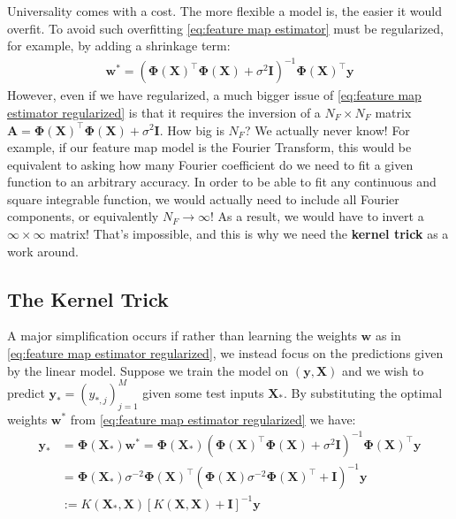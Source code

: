 \documentclass[11pt]{article}
\theoremstyle{plain} %
\theoremstyle{remark}
\begin{document}
Universality comes with a cost. The more flexible a model is, the easier it
would overfit. To avoid such overfitting \cref{eq:feature map estimator} must be regularized, for example,
by adding a shrinkage term:
\begin{align}
  \mathbf{w}^{*}=\left(\mathbf{\Phi}(\mathbf{X})^\top \mathbf{\Phi}(\mathbf{X})+\sigma^{2} \mathbf{I}\right)^{-1} \mathbf{\Phi}(\mathbf{X})^\top \mathbf{y}
  \label{eq:feature map estimator regularized}
\end{align}
However, even if we have regularized, a much bigger issue of \cref{eq:feature
  map estimator regularized} is that it requires the inversion of a $N_{F} \times
  N_{F}$ matrix $\mathbf{A}=\mathbf{\Phi}(\mathbf{X})^\top
  \mathbf{\Phi}(\mathbf{X})+\sigma^{2} \mathbf{I}$. How big is $N_{F}$? We
actually never know! For example, if our feature map model is the Fourier
Transform, this would be equivalent to asking how many Fourier coefficient do we
need to fit a given function to an arbitrary accuracy. In order to be able to
fit any continuous and square integrable function, we would actually need to
include all Fourier components, or equivalently $N_{F} \rightarrow \infty$! As a
result, we would have to invert a $\infty \times \infty$ matrix! That's
impossible, and this is why we need the \textbf{kernel trick} as a work around.

\subsection{The Kernel Trick}

A major simplification occurs if rather than learning the weights $\mathbf{w}$
as in \cref{eq:feature map estimator regularized}, we instead focus on the predictions
given by the linear model. Suppose we train the model on $(\mathbf{y}, \mathbf{X})$
and we wish to predict $\mathbf{y}_{*}=\left(y_{*, j}\right)_{j=1}^{M}$ given
some test inputs $\mathbf{X}_{*}$. By substituting the optimal weights
$\mathbf{w}^{*}$ from \cref{eq:feature map estimator regularized} we have:
\begin{align*}
  \mathbf{y}_{*} & =\mathbf{\Phi}\left(\mathbf{X}_{*}\right) \mathbf{w}^{*}
  =\mathbf{\Phi}\left(\mathbf{X}_{*}\right)\left(\mathbf{\Phi}(\mathbf{X})^\top \mathbf{\Phi}(\mathbf{X})+\sigma^{2} \mathbf{I}\right)^{-1} \mathbf{\Phi}(\mathbf{X})^\top \mathbf{y}                               \\
                 & =\mathbf{\Phi}\left(\mathbf{X}_{*}\right) \sigma^{-2} \mathbf{\Phi}(\mathbf{X})^\top\left(\mathbf{\Phi}(\mathbf{X}) \sigma^{-2} \mathbf{\Phi}(\mathbf{X})^\top+\mathbf{I}\right)^{-1} \mathbf{y} \\
                 & :=K\left(\mathbf{X}_{*}, \mathbf{X}\right)[K(\mathbf{X}, \mathbf{X})+\mathbf{I}]^{-1} \mathbf{y}
\end{align*}
\end{document}
